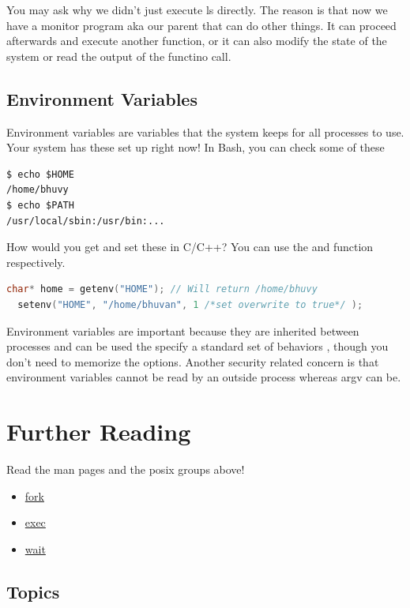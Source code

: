 \begin{itemize}
You may ask why we didn't just execute ls directly.
The reason is that now we have a monitor program aka our parent that can do other things.
It can proceed afterwards and execute another function, or it can also modify the state of the system or read the output of the functino call.

\subsection{Environment Variables}

Environment variables are variables that the system keeps for all processes to use.
Your system has these set up right now!
In Bash, you can check some of these

\begin{verbatim}
$ echo $HOME
/home/bhuvy
$ echo $PATH
/usr/local/sbin:/usr/bin:...
\end{verbatim}

How would you get and set these in C/C++? You can use the  and  function respectively.

\begin{lstlisting}[language=C]
  char* home = getenv("HOME"); // Will return /home/bhuvy
  setenv("HOME", "/home/bhuvan", 1 /*set overwrite to true*/ );
\end{lstlisting}

Environment variables are important because they are inherited between processes and can be used the specify a standard set of behaviors \cite{env_std_2018}, though you don't need to memorize the options.
Another security related concern is that environment variables cannot be read by an outside process whereas argv can be.

\section{Further Reading}

Read the man pages and the posix groups above!

\begin{itemize}
\item \href{http://man7.org/linux/man-pages/man2/fork.2.html}{fork}
\item \href{http://man7.org/linux/man-pages/man3/exec.3.html}{exec}
\item \href{http://man7.org/linux/man-pages/man2/wait.2.html}{wait}
\end{itemize}

\subsection{Topics}


\end{itemize}

